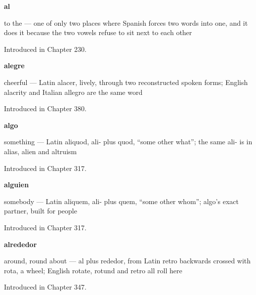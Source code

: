 \noindent\begin{minipage}[t]{\linewidth}
\raggedright
\textbf{al}\par
\small to the — one of only two places where Spanish forces two words into one, and it does it because the two vowels refuse to sit next to each other\par
\footnotesize Introduced in Chapter 230.
\end{minipage}\par\medskip

\noindent\begin{minipage}[t]{\linewidth}
\raggedright
\textbf{alegre}\par
\small cheerful — Latin alacer, lively, through two reconstructed spoken forms; English alacrity and Italian allegro are the same word\par
\footnotesize Introduced in Chapter 380.
\end{minipage}\par\medskip

\noindent\begin{minipage}[t]{\linewidth}
\raggedright
\textbf{algo}\par
\small something — Latin aliquod, ali- plus quod, \textquotedblleft{}some other what\textquotedblright{}; the same ali- is in alias, alien and altruism\par
\footnotesize Introduced in Chapter 317.
\end{minipage}\par\medskip

\noindent\begin{minipage}[t]{\linewidth}
\raggedright
\textbf{alguien}\par
\small somebody — Latin aliquem, ali- plus quem, \textquotedblleft{}some other whom\textquotedblright{}; algo's exact partner, built for people\par
\footnotesize Introduced in Chapter 317.
\end{minipage}\par\medskip

\noindent\begin{minipage}[t]{\linewidth}
\raggedright
\textbf{alrededor}\par
\small around, round about — al plus rededor, from Latin retro backwards crossed with rota, a wheel; English rotate, rotund and retro all roll here\par
\footnotesize Introduced in Chapter 347.
\end{minipage}\par\medskip

